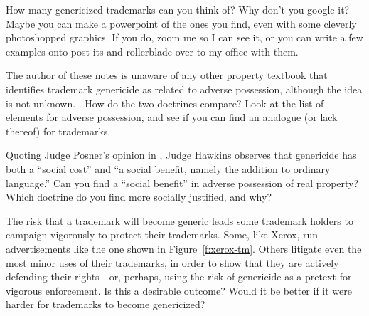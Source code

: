 \item How many genericized trademarks can you think of? Why don't you google it?
Maybe you can make a powerpoint of the ones you find, even with some cleverly
photoshopped graphics. If you do, zoom me so I can see it, or you can write a
few examples onto post-its and rollerblade over to my office with them.



\item The author of these notes is unaware of any other property textbook that
identifies trademark genericide as related to adverse possession, although the
idea is not unknown. . How do the two doctrines compare? Look at the
list of elements for adverse possession, and see if you can find an analogue (or
lack thereof) for trademarks.




\item Quoting Judge Posner's opinion in \optclause,
Judge Hawkins observes that genericide has both a ``social cost'' and ``a social
benefit, namely the addition to ordinary language.'' Can you find a ``social
benefit'' in adverse possession of real property? Which doctrine do you find
more socially justified, and why?


\item The risk that a trademark will become generic leads some trademark holders
to campaign vigorously to protect their trademarks. Some, like Xerox, run
advertisements like the one shown in Figure~\ref{f:xerox-tm}. Others litigate
even the most minor uses of their trademarks, in order to show that they are
actively defending their rights---or, perhaps, using the risk of genericide as a
pretext for vigorous enforcement. Is this a desirable outcome? Would it be
better if it were harder for trademarks to become genericized?
